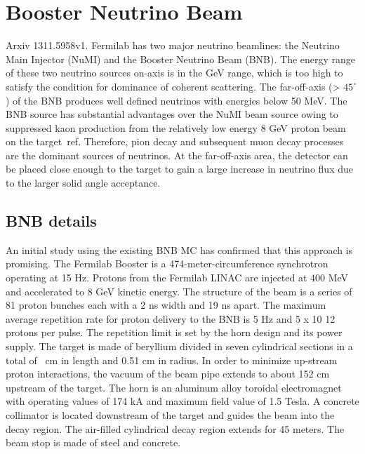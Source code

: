 
\chapter{Booster Neutrino Beam}
\label{app:A}

Arxiv 1311.5958v1.
Fermilab has two major neutrino beamlines: the Neutrino Main Injector (NuMI) and %
the Booster Neutrino Beam (BNB).
The energy range of these two neutrino sources on-axis is in the GeV range, %
which is too high to satisfy the condition for dominance of coherent scattering. 
The far-off-axis (> $45^\circ$) of the BNB produces well defined neutrinos with %
energies below 50 MeV.
The BNB source has substantial advantages over the NuMI beam source owing to suppressed %
kaon production from the relatively low energy 8 GeV proton beam on the target~ref. 
Therefore, pion decay and subsequent muon decay processes are the dominant sources of neutrinos. 
At the far-off-axis area, the detector can be placed close enough to the target to gain a %
large increase in neutrino flux due to the larger solid angle acceptance.

\section{BNB details}
An initial study using the existing BNB MC has confirmed that this approach is promising.
The Fermilab Booster is a 474-meter-circumference synchrotron operating at 15 Hz. 
Protons from the Fermilab LINAC are injected at 400 MeV and accelerated to 8 GeV kinetic energy. 
The structure of the beam is a series of 81 proton bunches each with a 2 ns width and 19 ns apart. 
The maximum average repetition rate for proton delivery to the BNB is 5 Hz and 5 x 10 12 protons %
per pulse. 
The repetition limit is set by the horn design and its power supply. 
The target is made of beryllium divided in seven cylindrical sections in a total of ~cm %
in length and 0.51 cm in radius.
In order to minimize up-stream proton interactions, the vacuum of the beam pipe extends to %
about 152 cm upstream of the target.
The horn is an aluminum alloy toroidal electromagnet with operating values of 174 kA and %
maximum field value of 1.5 Tesla. 
A concrete collimator is located downstream of the target and guides the beam into the decay region.
The air-filled cylindrical decay region extends for 45 meters. 
The beam stop is made of steel and concrete. 

